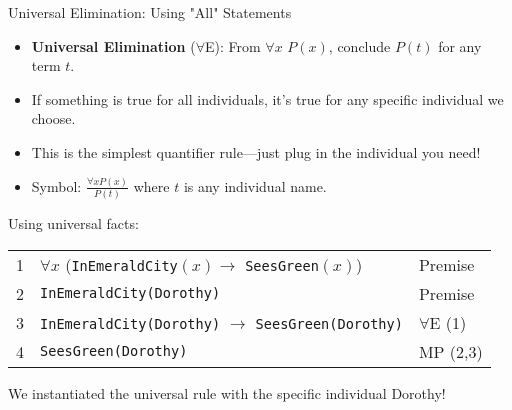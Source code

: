 \documentclass{beamer}
\begin{document}
	\begin{frame}{Universal Elimination: Using "All" Statements}
		\begin{itemize}
			\item \textbf{Universal Elimination} ($\forall$E): From $\forall x$ $P(x)$, conclude $P(t)$ for any term $t$.
			\item If something is true for all individuals, it's true for any specific individual we choose.
			\item This is the simplest quantifier rule—just plug in the individual you need!
			\item Symbol: $\frac{\forall x P(x)}{P(t)}$ where $t$ is any individual name.
		\end{itemize}
		
		\begin{example}
			Using universal facts:
			\begin{tabular}{|c|l|l|}
				\hline
				1 & $\forall x$ (\texttt{InEmeraldCity}$(x) \rightarrow$ \texttt{SeesGreen}$(x)$) & Premise \\
				2 & \texttt{InEmeraldCity(Dorothy)} & Premise \\
				3 & \texttt{InEmeraldCity(Dorothy)} $\rightarrow$ \texttt{SeesGreen(Dorothy)} & $\forall$E (1) \\
				4 & \texttt{SeesGreen(Dorothy)} & MP (2,3) \\
				\hline
			\end{tabular}
			
			We instantiated the universal rule with the specific individual Dorothy!
		\end{example}
	\end{frame}
	
\end{document}
